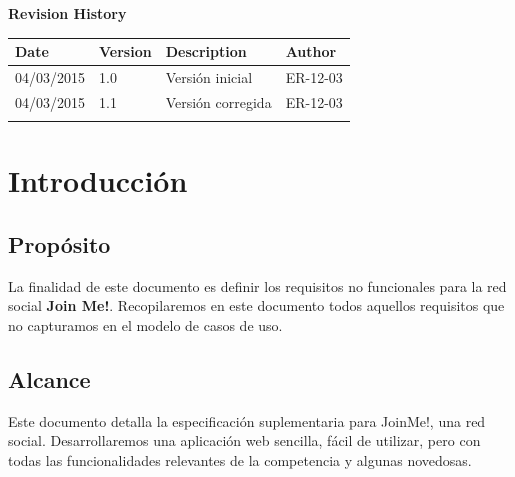 \documentclass[12pt, a4paper, titlepage]{article}
\begin{document}
\begin{titlepage}
\vspace{2cm}
\begin{center}
	\large{\textbf{Revision History}}
	
    \begin{tabular}{ | p{4cm} | p{2cm} | p{5cm} | p{4cm} |}
    \hline
    \textbf{Date} & \textbf{Version} & \textbf{Description} & \textbf{Author} \\ \hline
    04/03/2015 & 1.0 & Versión inicial & ER-12-03  \\ \hline
    04/03/2015& 1.1 & Versión corregida & ER-12-03\\ \hline
    & & & \\ \hline
    \end{tabular}
\end{center}

\end{titlepage}
\clearpage


\tableofcontents
\clearpage

\section{Introducción}

\subsection{Propósito}

La finalidad de este documento es definir los requisitos no funcionales para la red social \textbf{Join Me!}. Recopilaremos en este documento todos aquellos requisitos que no capturamos en el modelo de casos de uso.

\subsection{Alcance}

Este documento detalla la especificación suplementaria para JoinMe!, una red social. Desarrollaremos una aplicación web sencilla, fácil de utilizar, pero con todas las funcionalidades relevantes de la competencia y algunas novedosas.
\end{document}
